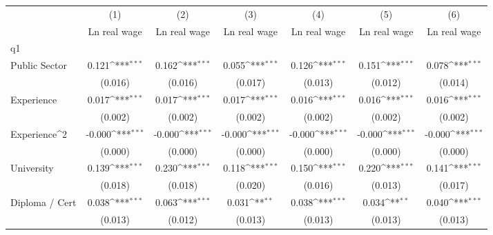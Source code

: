 {
\def\sym#1{\ifmmode^{#1}\else\(^{#1}\)\fi}
\begin{tabular}{l*{6}{c}}
\hline\hline
                    &\multicolumn{1}{c}{(1)}&\multicolumn{1}{c}{(2)}&\multicolumn{1}{c}{(3)}&\multicolumn{1}{c}{(4)}&\multicolumn{1}{c}{(5)}&\multicolumn{1}{c}{(6)}\\
                    &\multicolumn{1}{c}{Ln real wage}&\multicolumn{1}{c}{Ln real wage}&\multicolumn{1}{c}{Ln real wage}&\multicolumn{1}{c}{Ln real wage}&\multicolumn{1}{c}{Ln real wage}&\multicolumn{1}{c}{Ln real wage}\\
\hline
q1                  &                     &                     &                     &                     &                     &                     \\
Public Sector       &       0.121\sym{***}&       0.162\sym{***}&       0.055\sym{***}&       0.126\sym{***}&       0.151\sym{***}&       0.078\sym{***}\\
                    &     (0.016)         &     (0.016)         &     (0.017)         &     (0.013)         &     (0.012)         &     (0.014)         \\
Experience          &       0.017\sym{***}&       0.017\sym{***}&       0.017\sym{***}&       0.016\sym{***}&       0.016\sym{***}&       0.016\sym{***}\\
                    &     (0.002)         &     (0.002)         &     (0.002)         &     (0.002)         &     (0.002)         &     (0.002)         \\
Experience^{2}      &      -0.000\sym{***}&      -0.000\sym{***}&      -0.000\sym{***}&      -0.000\sym{***}&      -0.000\sym{***}&      -0.000\sym{***}\\
                    &     (0.000)         &     (0.000)         &     (0.000)         &     (0.000)         &     (0.000)         &     (0.000)         \\
University          &       0.139\sym{***}&       0.230\sym{***}&       0.118\sym{***}&       0.150\sym{***}&       0.220\sym{***}&       0.141\sym{***}\\
                    &     (0.018)         &     (0.018)         &     (0.020)         &     (0.016)         &     (0.013)         &     (0.017)         \\
Diploma / Cert      &       0.038\sym{***}&       0.063\sym{***}&       0.031\sym{**} &       0.038\sym{***}&       0.034\sym{**} &       0.040\sym{***}\\
                    &     (0.013)         &     (0.012)         &     (0.013)         &     (0.013)         &     (0.013)         &     (0.013)         \\

\end{tabular}}
